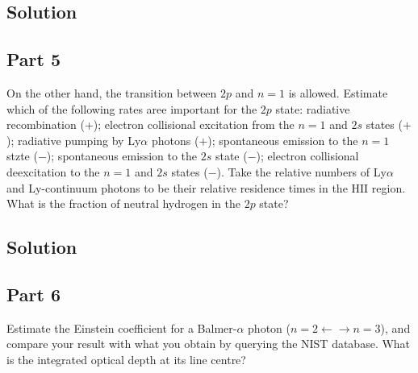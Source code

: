 \documentclass[12pt]{article}
\begin{document}

\subsection*{Solution}




\subsection*{Part 5}

On the other hand, the transition between $2p$ and $n=1$ is allowed. Estimate which of the following rates aree important for the $2p$ state: radiative recombination (+); electron collisional excitation from the $n=1$ and $2s$ states ($+$); radiative pumping by Ly$\alpha$ photons ($+$); spontaneous emission to the $n=1$ stzte ($-$); spontaneous emission to the $2s$ state ($-$); electron collisional deexcitation to the $n=1$ and $2s$ states ($-$). Take the relative numbers of Ly$\alpha$ and Ly-continuum photons to be their relative residence times in the $\mathrm{HII}$ region. What is the fraction of neutral hydrogen in the $2p$ state?


\subsection*{Solution}




\subsection*{Part 6}

Estimate the Einstein coefficient for a Balmer-$\alpha$ photon ($n=2 \leftarrow\rightarrow n=3$), and compare your result with what you obtain by querying the NIST database. What is the integrated optical depth at its line centre?
\end{document}
